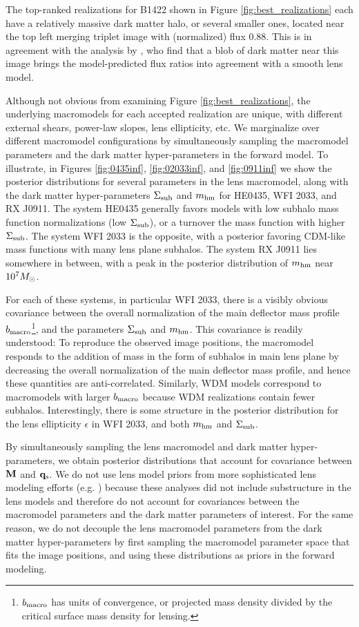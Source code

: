 The top-ranked realizations for B1422 shown in Figure \ref{fig:best_realizations} each have a relatively massive dark matter halo, or several smaller ones, located near the top left merging triplet image with (normalized) flux 0.88. This is in agreement with the analysis by \citet{Nierenberg++14}, who find that a blob of dark matter near this image brings the model-predicted flux ratios into agreement with a smooth lens model. 

Although not obvious from examining Figure \ref{fig:best_realizations}, the underlying macromodels for each accepted realization are unique, with different external shears, power-law slopes, lens ellipticity, etc. We marginalize over different macromodel configurations by simultaneously sampling the macromodel parameters and the dark matter hyper-parameters in the forward model. To illustrate, in Figures \ref{fig:0435inf}, \ref{fig:02033inf}, and \ref{fig:0911inf} we show the posterior distributions for several parameters in the lens macromodel, along with the dark matter hyper-parameters $\Sigma_{\rm{sub}}$ and ${m_{\rm{hm}}}$ for HE0435, WFI 2033, and RX J0911. The system HE0435 generally favors models with low subhalo mass function normalizations (low $\Sigma_{\rm{sub}}$), or a turnover the mass function with higher $\Sigma_{\rm{sub}}$. The system WFI 2033 is the opposite, with a posterior favoring CDM-like mass functions with many lens plane subhalos. The system RX J0911 lies somewhere in between, with a peak in the posterior distribution of ${m_{\rm{hm}}}$ near $10^{7} {M_{\odot}}$. 

For each of these systems, in particular WFI 2033, there is a visibly obvious covariance between the overall normalization of the main deflector mass profile $b_{\rm{macro}}$\footnote{$b_{\rm{macro}}$ has units of convergence, or projected mass density divided by the critical surface mass density for lensing.}, and the parameters $\Sigma_{\rm{sub}}$ and ${m_{\rm{hm}}}$. This covariance is readily understood: To reproduce the observed image positions, the macromodel responds to the addition of mass in the form of subhalos in main lens plane by decreasing the overall normalization of the main deflector mass profile, and hence these quantities are anti-correlated. Similarly, WDM models correspond to macromodels with larger $b_{\rm{macro}}$ because WDM realizations contain fewer subhalos. Interestingly, there is some structure in the posterior distribution for the lens ellipticity $\epsilon$ in WFI 2033, and both ${m_{\rm{hm}}}$ and $\Sigma_{\rm{sub}}$. 

By simultaneously sampling the lens macromodel and dark matter hyper-parameters, we obtain posterior distributions that account for covariance between ${\bf{M}}$ and ${\bf{q}_{\rm{s}}}$. We do not use lens model priors from more sophisticated lens modeling efforts (e.g. \citet{Wong++17,Shajib++18}) because these analyses did not include substructure in the lens models and therefore do not account for covariances between the macromodel parameters and the dark matter parameters of interest. For the same reason, we do not decouple the lens macromodel parameters from the dark matter hyper-parameters by first sampling the macromodel parameter space that fits the image positions, and using these distributions as priors in the forward modeling. 

